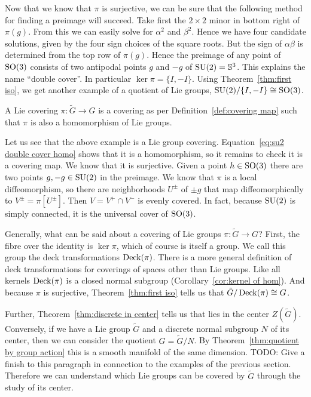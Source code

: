 Now that we know that $\pi$ is surjective, we can be sure that the following method for finding a preimage will succeed.
Take first the $2\times2$ minor in bottom right of $\pi(g)$.
From this we can easily solve for $\alpha^2$ and $\beta^2$.
Hence we have four candidate solutions, given by the four sign choices of the square roots.
But the sign of $\alpha\beta$ is determined from the top row of $\pi(g)$.
Hence the preimage of any point of $\mathrm{SO}(3)$ consists of two antipodal points $g$ and $-g$ of $\mathrm{SU}(2) = \mathbb{S}^3$.
This explains the name ``double cover''.
In particular $\ker \pi = \{I, -I\}$.
Using Theorem~\ref{thm:first iso}, we get another example of a quotient of Lie groups, $\mathrm{SU}(2)/\{I, -I\} \cong \mathrm{SO}(3)$.

\begin{theorem}
A Lie covering $\pi : \tilde{G} \to G$ is a covering as per Definition~\ref{def:covering map} such that $\pi$ is also a homomorphism of Lie groups.
\end{theorem}

Let us see that the above example is a Lie group covering.
Equation~\eqref{eq:su2 double cover homo} shows that it is a homomorphism, so it remains to check it is a covering map.
We know that it is surjective.
Given a point $h \in \mathrm{SO}(3)$ there are two points $g,-g \in \mathrm{SU}(2)$ in the preimage.
We know that $\pi$ is a local diffeomorphism, so there are neighborhoods $U^\pm$ of $\pm g$ that map diffeomorphically to $V^\pm = \pi[U^\pm]$.
Then $V = V^+ \cap V^-$ is evenly covered.
In fact, because $\mathrm{SU}(2)$ is simply connected, it is the universal cover of $\mathrm{SO}(3)$.

Generally, what can be said about a covering of Lie groups $\pi : \tilde{G} \to G$?
First, the fibre over the identity is $\ker \pi$, which of course is itself a group.
We call this group the deck transformations $\operatorname{Deck}(\pi)$.
There is a more general definition of deck transformations for coverings of spaces other than Lie groups.
Like all kernels $\operatorname{Deck}(\pi)$ is a closed normal subgroup (Corollary~\ref{cor:kernel of hom}).
And because $\pi$ is surjective, Theorem~\ref{thm:first iso} tells us that $\tilde{G}/\operatorname{Deck}(\pi) \cong G$.

Further, Theorem~\ref{thm:discrete in center} tells us that lies in the center $Z(\tilde{G})$.
Conversely, if we have a Lie group $\tilde{G}$ and a discrete normal subgroup $N$ of its center, then we can consider the quotient $G = \tilde{G}/N$.
By Theorem~\ref{thm:quotient by group action} this is a smooth manifold of the same dimension.
TODO: Give a finish to this paragraph in connection to the examples of the previous section.
Therefore we can understand which Lie groups can be covered by $\tilde{G}$ through the study of its center.

